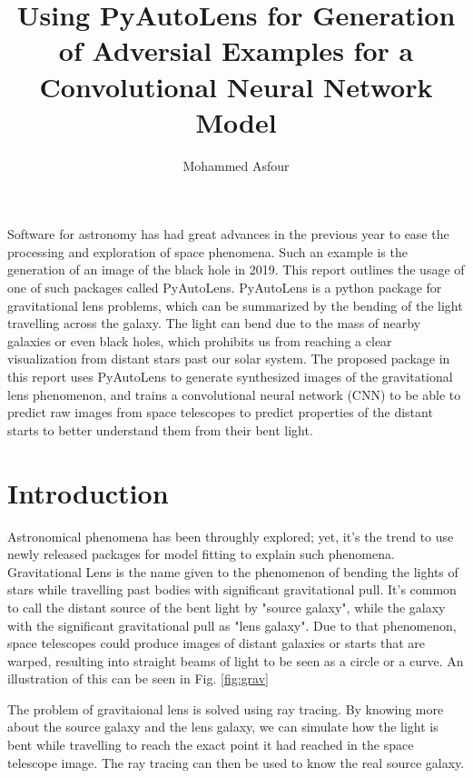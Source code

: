 \documentclass[12pt]{article}
\title{Using PyAutoLens for Generation of Adversial Examples for a Convolutional Neural Network Model}
\author{Mohammed Asfour}
\begin{document}
\maketitle

\abstract%
Software for astronomy has had great advances in the previous year to ease the processing and exploration of space phenomena. Such an example is the generation of an image of the black hole in 2019. This report outlines the usage of one of such packages called PyAutoLens. PyAutoLens is a python package for gravitational lens problems, which can be summarized by the bending of the light travelling across the galaxy. The light can bend due to the mass of nearby galaxies or even black holes, which prohibits us from reaching a clear visualization from distant stars past our solar system. The proposed package in this report uses PyAutoLens to generate synthesized images of the gravitational lens phenomenon, and trains a convolutional neural network (CNN) to be able to predict raw images from space telescopes to predict properties of the distant starts to better understand them from their bent light.

\section{Introduction}
Astronomical phenomena has been throughly explored\cite{astro5}\cite{astro3}\cite{astro4}; yet, it's the trend to use newly released packages for model fitting to explain such phenomena\cite{astro1}\cite{astro2}.
Gravitational Lens is the name given to the phenomenon of bending the lights of stars while travelling past bodies with significant gravitational pull. It's common to call the distant source of the bent light by "source galaxy", while the galaxy with the significant gravitational pull as "lens galaxy". Due to that phenomenon, space telescopes could produce images of distant galaxies or starts that are warped, resulting into straight beams of light to be seen as a circle or a curve. An illustration of this can be seen in Fig. \ref{fig:grav}

The problem of gravitaional lens is solved using ray tracing. By knowing more about the source galaxy and the lens galaxy, we can simulate how the light is bent while travelling to reach the exact point it had reached in the space telescope image. The ray tracing can then be used to know the real source galaxy.
\end{document}
